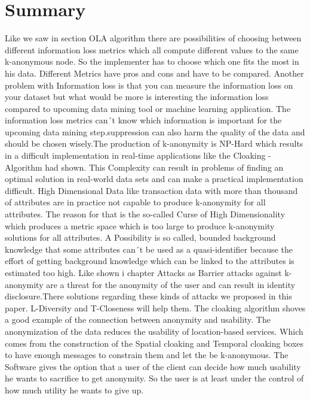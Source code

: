 \documentclass{llncs}
\begin{document}
\section{Summary}
Like we saw in section OLA algorithm there are possibilities of choosing between different information loss metrics which all compute different values to the same k-anonymous node. So the implementer has to choose which one fits the most in his data. Different Metrics have pros and cons and have to be compared. Another problem with Information loss is that you can measure the information loss on your dataset but what would be more is interesting the information loss compared to upcoming data mining tool or machine learning application. The information loss metrics can´t know which information is important for the upcoming data mining step.suppression can also harm the quality of the data and should be chosen wisely.The production of k-anonymity is NP-Hard which results in a difficult implementation in real-time applications like the Cloaking - Algorithm had shown. This Complexity can result in problems of finding an optimal solution in real-world data sets and can make a practical implementation difficult. High Dimensional Data like transaction data with more than thousand of attributes are in practice not capable to produce k-anonymity for all attributes. The reason for that is the so-called Curse of High Dimensionality which produces a metric space which is too large to produce k-anonymity solutions for all attributes. A  Possibility is so called, bounded background knowledge that some attributes can´t be used as a quasi-identifier because the effort of getting background knowledge which can be linked to the attributes is estimated too high. Like shown i chapter {Attacks as Barrier} attacks against k-anonymity are a threat for the anonymity of the user and can result in identity disclosure.There solutions regarding these kinds of attacks we proposed in this paper. L-Diversity and T-Closeness will help them. The cloaking algorithm shoves a good example of the connection between anonymity and usability. The anonymization of the data reduces the usability of location-based services. Which comes from the construction of the Spatial cloaking and Temporal cloaking boxes to have enough messages to constrain them and let the be k-anonymous. The Software gives the option that a user of the client can decide how much usability he wants to sacrifice to get anonymity. So the user is at least under the control of how much utility he wants to give up. 
\newpage


\end{document}
